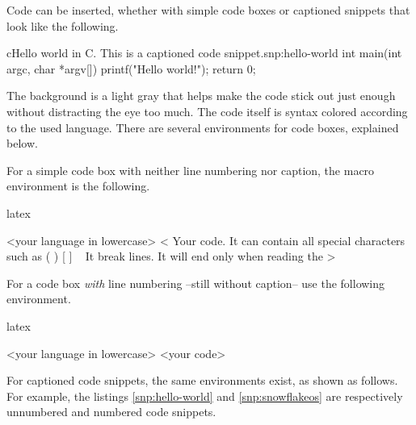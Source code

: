 \documentclass[raggedright, twoside, 11pt]{tufte-style-article}
\begin{document}
Code can be inserted, whether with simple code boxes or captioned snippets that look like the following.
\begin{snippet}{c}{Hello world in C. This is a captioned code snippet.}{snp:hello-world}
int main(int argc, char *argv[]) {
	printf("Hello world!");
	return 0;
}
\end{snippet}

The background is a light gray that helps make the code stick out just enough without distracting the eye too much. The code itself is syntax colored according to the used language. There are several environments for code boxes, explained below.

For a simple code box with neither line numbering nor caption, the macro environment is the following.

%
\begin{altcodebox}{latex}
\begin{codebox}{<your language in lowercase>}
<
Your code. It can contain all special characters such as { } ( ) [ ] \ %
It break lines.
It will end only when reading the %
>
\end{codebox}
\end{altcodebox}

For a code box \textit{with} line numbering --still without caption-- use the following environment.
\begin{altcodebox}{latex}
\begin{codeboxnum}{<your language in lowercase>}
<your code>
\end{codeboxnum}
\end{altcodebox}

For captioned code snippets, the same environments exist, as shown as follows. For example, the listings \ref{snp:hello-world} and \ref{snp:snowflakeos} are respectively unnumbered and numbered code snippets.
\end{document}
